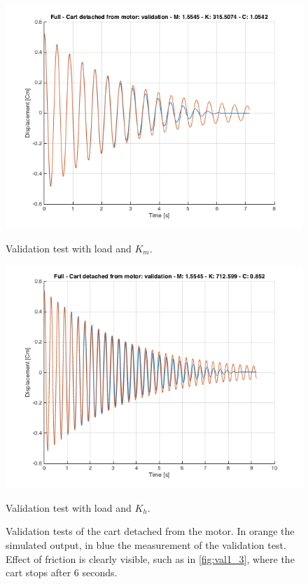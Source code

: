 \begin{figure} [!h]
\vspace*{0.5cm} %
\begin{minipage}[t]{0.45\textwidth}
\includegraphics[width=\linewidth]{img/validation_ml_km_full.png}
\caption{Validation test with  load and $K_m$.}
\label{fig:val1_3}
\end{minipage}
\hspace{\fill}
\begin{minipage}[t]{0.45\textwidth}
\includegraphics[width=\linewidth]{img/validation_ml_kh_full.png}
\caption{Validation test with  load and $K_h$.}
\label{fig:val1_4}
\end{minipage}
\caption{Validation tests of the cart detached from the motor. In orange the simulated output, in blue the measurement of the validation test. Effect of friction is clearly visible, such as in \ref{fig:val1_3}, where the cart stops after $6$ seconds.}
\label{fig:val1}
\end{figure}

